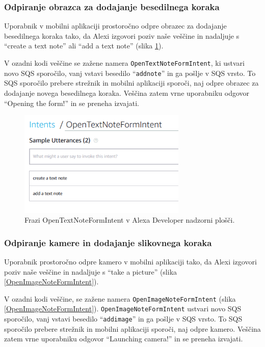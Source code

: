 \documentclass[a4paper, 12pt]{book}
\begin{document}
\subsubsection{Odpiranje obrazca za dodajanje besedilnega koraka}

Uporabnik v mobilni aplikaciji prostoročno odpre obrazec za dodajanje besedilnega koraka tako, da Alexi izgovori poziv naše veščine in nadaljuje s \enquote{create a text note} ali \enquote{add a text note} (slika \ref{OpenTextNoteFormIntent}).

V ozadni kodi veščine se zažene namera \texttt{OpenTextNoteFormIntent}, ki ustvari novo SQS sporočilo, vanj vstavi besedilo \enquote{\texttt{addnote}} in ga pošlje v SQS vrsto.
To SQS sporočilo prebere strežnik in mobilni aplikaciji sporoči, naj odpre obrazec za dodajanje novega besedilnega koraka.
Veščina zatem vrne uporabniku odgovor \enquote{Opening the form!} in se preneha izvajati.

\begin{figure}[H]
\begin{center}
\includegraphics[width=8cm]{intent_text}
\end{center}
\caption{Frazi OpenTextNoteFormIntent v Alexa Developer nadzorni plošči.}
\label{OpenTextNoteFormIntent}
\end{figure}


\subsubsection{Odpiranje kamere in dodajanje slikovnega koraka}

Uporabnik prostoročno odpre kamero v mobilni aplikaciji tako, da Alexi izgovori poziv naše veščine in nadaljuje s \enquote{take a picture} (slika \ref{OpenImageNoteFormIntent}).

V ozadni kodi veščine, se zažene namera \texttt{OpenImageNoteFormIntent} (slika \ref{OpenImageNoteFormIntent}).
\texttt{OpenImageNoteFormIntent} ustvari novo SQS sporočilo, vanj vstavi besedilo \enquote{\texttt{addimage}} in ga pošlje v SQS vrsto.
To SQS sporočilo prebere strežnik in mobilni aplikaciji sporoči, naj odpre kamero.
Veščina zatem vrne uporabniku odgovor \enquote{Launching camera!} in se preneha izvajati.
\end{document}
